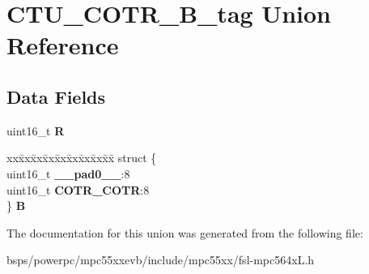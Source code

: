 \hypertarget{unionCTU__COTR__16B__tag}{}\section{C\+T\+U\+\_\+\+C\+O\+T\+R\+\_\+B\+\_\+tag Union Reference}
\label{unionCTU__COTR__16B__tag}
\subsection*{Data Fields}
\begin{DoxyCompactItemize}
\item 
\mbox{\label{unionCTU__COTR__16B__tag_aa293a2a1f40e90e48a711941b9970b81}} 
uint16\+\_\+t {\bfseries R}
\item 
\mbox{\label{unionCTU__COTR__16B__tag_a5d78609db2c9cae55eb75c243e529f6d}} 
\begin{tabbing}
xx\=xx\=xx\=xx\=xx\=xx\=xx\=xx\=xx\=\kill
struct \{\\
\>uint16\_t {\bfseries \_\_pad0\_\_}:8\\
\>uint16\_t {\bfseries COTR\_COTR}:8\\
\} {\bfseries B}\\

\end{tabbing}\end{DoxyCompactItemize}


The documentation for this union was generated from the following file\+:\begin{DoxyCompactItemize}
\item 
bsps/powerpc/mpc55xxevb/include/mpc55xx/fsl-\/mpc564x\+L.\+h\end{DoxyCompactItemize}

